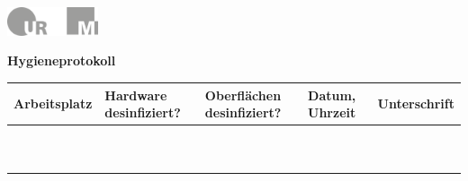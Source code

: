 \documentclass[24pt, a4paper, landscape]{article}
\begin{document}
\pagestyle{empty}

\raggedleft

\includegraphics[width=0.2\textwidth]{logo}

\sffamily
\centering
\Huge

\textbf{Hygieneprotokoll}

\vspace{1cm}

\raggedright
\LARGE

\renewcommand{\arraystretch}{1.5}
\begin{tabularx}{\textwidth}{ | c | s | s | Y | Y | }
    \hline
    \textbf{Arbeitsplatz} & \textbf{Hardware desinfiziert?} & \textbf{Oberflächen desinfiziert?} & \textbf{Datum, Uhrzeit} & \textbf{Unterschrift} \\
    \hline
    & & & & \\
    \hline
    & & & & \\
    \hline
    & & & & \\
    \hline
    & & & & \\
    \hline
    & & & & \\
    \hline
    & & & & \\
    \hline
    & & & & \\
    \hline
    & & & & \\
    \hline
    & & & & \\
    \hline
    & & & & \\
    \hline
\end{tabularx}
\end{document}
